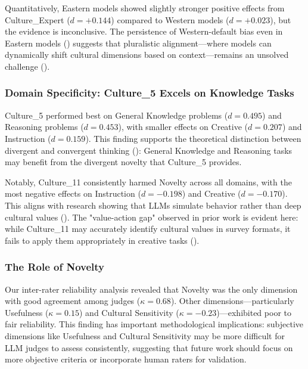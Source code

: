 \documentclass{article}
\begin{document}
Quantitatively, Eastern models showed slightly stronger positive effects from Culture\_Expert (\(d = +0.144\)) compared to Western models (\(d = +0.023\)), but the evidence is inconclusive. The persistence of Western-default bias even in Eastern models (\cite{bolei_ma_78d40201}) suggests that pluralistic alignment—where models can dynamically shift cultural dimensions based on context—remains an unsolved challenge (\cite{kharchenkoHowWellLLMs2024}).

\subsubsection{Domain Specificity: Culture\_5 Excels on Knowledge Tasks}

Culture\_5 performed best on General Knowledge problems (\(d = 0.495\)) and Reasoning problems (\(d = 0.453\)), with smaller effects on Creative (\(d = 0.207\)) and Instruction (\(d = 0.159\)). This finding supports the theoretical distinction between divergent and convergent thinking (\cite{vikram_arora_67282d96, harsh_kumar_84fce084}): General Knowledge and Reasoning tasks may benefit from the divergent novelty that Culture\_5 provides.

Notably, Culture\_11 consistently harmed Novelty across all domains, with the most negative effects on Instruction (\(d = -0.198\)) and Creative (\(d = -0.170\)). This aligns with research showing that LLMs simulate behavior rather than deep cultural values (\cite{kharchenkoHowWellLLMs2024}). The "value-action gap" observed in prior work is evident here: while Culture\_11 may accurately identify cultural values in survey formats, it fails to apply them appropriately in creative tasks (\cite{bolei_ma_78d40201}).

\subsubsection{The Role of Novelty}

Our inter-rater reliability analysis revealed that Novelty was the only dimension with good agreement among judges (\(\kappa = 0.68\)). Other dimensions—particularly Usefulness (\(\kappa = 0.15\)) and Cultural Sensitivity (\(\kappa = -0.23\))—exhibited poor to fair reliability. This finding has important methodological implications: subjective dimensions like Usefulness and Cultural Sensitivity may be more difficult for LLM judges to assess consistently, suggesting that future work should focus on more objective criteria or incorporate human raters for validation.
\end{document}

